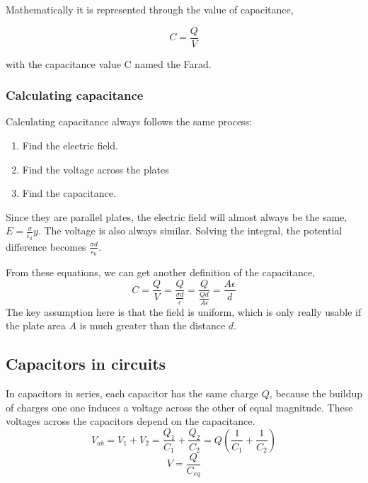 \documentclass{article}
\begin{document}
Mathematically it is represented through the value of capacitance, 

\begin{equation} C=\frac{Q}{V} \end{equation}

with the capacitance value C named the Farad. 

\subsubsection{Calculating capacitance}

Calculating capacitance always follows the same process:

\begin{enumerate}
	\item Find the electric field.
	\item Find the voltage across the plates
	\item Find the capacitance.
\end{enumerate}

Since they are parallel plates, the electric field will almost always be the same, $E=\frac{\sigma}{\epsilon_0}y$. The voltage is also always similar. Solving the integral, the potential difference becomes $\frac{\sigma d}{\epsilon_0}$.

From these equations, we can get another definition of the capacitance, 
\begin{equation} C=\frac{Q}{V}=\frac{Q}{\frac{\sigma d}{\epsilon}}=\frac{Q}{\frac{Q d}{A \epsilon}}=\frac{A \epsilon}{d} \end{equation}
The key assumption here is that the field is uniform, which is only really usable if the plate area $A$ is much greater than the distance $d$.

\subsection{Capacitors in circuits}

In capacitors in series, each capacitor has the same charge $Q$, because the buildup of charges one one induces a voltage across the other of equal magnitude. These voltages across the capacitors depend on the capacitance.
\begin{equation} V_{ab}=V_1+V_2=\frac{Q_1}{C_1}+\frac{Q_2}{C_2}=Q(\frac{1}{C_1}+\frac{1}{C_2})\end{equation}
\begin{equation} V=\frac{Q}{C_{eq}} \end{equation}
\end{document}
